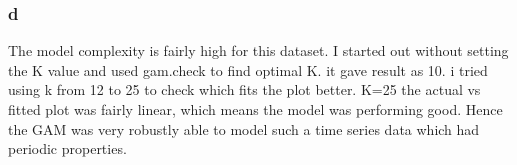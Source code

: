\documentclass[
]{article}
\begin{document}
\hypertarget{d-1}{%
\subsubsection{d}\label{d-1}}

The model complexity is fairly high for this dataset. I started out
without setting the K value and used gam.check to find optimal K. it
gave result as 10. i tried using k from 12 to 25 to check which fits the
plot better. K=25 the actual vs fitted plot was fairly linear, which
means the model was performing good. Hence the GAM was very robustly
able to model such a time series data which had periodic properties.
\end{document}
